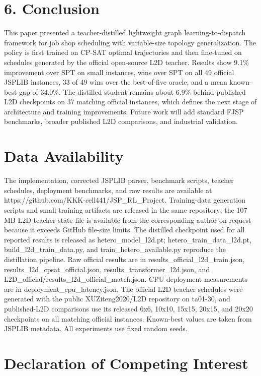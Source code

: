 \documentclass{article}
\begin{document}
\section*{6. Conclusion}

This paper presented a teacher-distilled lightweight graph learning-to-dispatch framework for job shop scheduling with variable-size topology generalization. The policy is first trained on CP-SAT optimal trajectories and then fine-tuned on schedules generated by the official open-source L2D teacher. Results show 9.1\% improvement over SPT on small instances, wins over SPT on all 49 official JSPLIB instances, 33 of 49 wins over the best-of-five oracle, and a mean known-best gap of 34.0\%. The distilled student remains about 6.9\% behind published L2D checkpoints on 37 matching official instances, which defines the next stage of architecture and training improvements. Future work will add standard FJSP benchmarks, broader published L2D comparisons, and industrial validation.


\section*{Data Availability}

The implementation, corrected JSPLIB parser, benchmark scripts, teacher schedules, deployment benchmarks, and raw results are available at https://github.com/KKK-cell441/JSP\_RL\_Project. Training-data generation scripts and small training artifacts are released in the same repository; the 107 MB L2D teacher-state file is available from the corresponding author on request because it exceeds GitHub file-size limits. The distilled checkpoint used for all reported results is released as hetero\_model\_l2d.pt; hetero\_train\_data\_l2d.pt, build\_l2d\_train\_data.py, and train\_hetero\_available.py reproduce the distillation pipeline. Raw official results are in results\_official\_l2d\_train.json, results\_l2d\_cpsat\_official.json, results\_transformer\_l2d.json, and L2D\_official/results\_l2d\_official\_match.json. CPU deployment measurements are in deployment\_cpu\_latency.json. The official L2D teacher schedules were generated with the public XUZiteng2020/L2D repository on ta01-30, and published-L2D comparisons use its released 6x6, 10x10, 15x15, 20x15, and 20x20 checkpoints on all matching official instances. Known-best values are taken from JSPLIB metadata. All experiments use fixed random seeds.


\section*{Declaration of Competing Interest}
\end{document}
